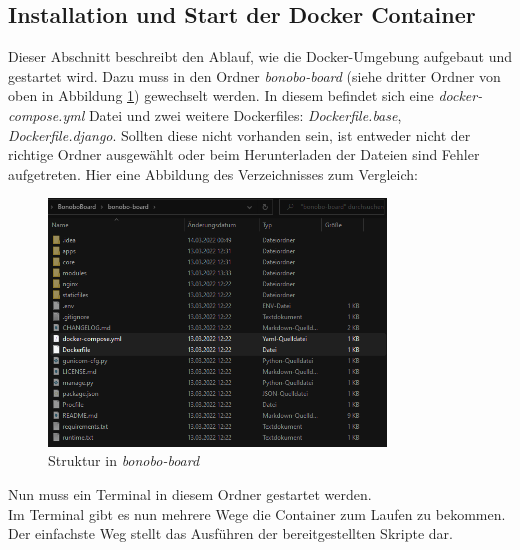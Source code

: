 \documentclass[a4paper,11pt]{scrartcl}
\begin{document}
\subsection{Installation und Start der Docker Container}
Dieser Abschnitt beschreibt den Ablauf, wie die Docker-Umgebung aufgebaut und gestartet wird.
Dazu muss in den Ordner \textit{bonobo-board} (siehe dritter Ordner von oben in Abbildung \ref{img:folder_1}) gewechselt werden.
In diesem befindet sich eine \textit{docker-compose.yml} Datei und zwei weitere Dockerfiles: \textit{Dockerfile.base}, \textit{Dockerfile.django}.
Sollten diese nicht vorhanden sein, ist entweder nicht der richtige Ordner ausgewählt oder beim Herunterladen der Dateien sind Fehler aufgetreten.
Hier eine Abbildung des Verzeichnisses zum Vergleich:
\begin{figure}[H]
\begin{center}
\includegraphics[width=0.8\textwidth]{folder_repo_2}
\caption{Struktur in \textit{bonobo-board}}
\label{img:folder_1}
\end{center}
\end{figure}

\noindent Nun muss ein Terminal in diesem Ordner gestartet werden.\\
Im Terminal gibt es nun mehrere Wege die Container zum Laufen zu bekommen.
Der einfachste Weg stellt das Ausführen der bereitgestellten Skripte dar.
\end{document}
